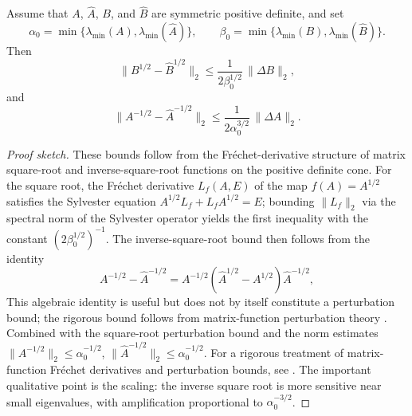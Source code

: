 \begin{proposition}
	Assume that \(A\), \(\widehat A\), \(B\), and \(\widehat B\) are symmetric positive
	definite, and set
	\[
		\alpha_0 = \min\{\lambda_{\min}(A), \lambda_{\min}(\widehat A)\},
		\qquad
		\beta_0 = \min\{\lambda_{\min}(B), \lambda_{\min}(\widehat B)\}.
	\]
	Then
	\[
		\|B^{1/2} - \widehat B^{1/2}\|_2
		\le
		\frac{1}{2\beta_0^{1/2}}\,\|\Delta B\|_2,
	\]
	and
	\[
		\|A^{-1/2} - \widehat A^{-1/2}\|_2
		\le
		\frac{1}{2\alpha_0^{3/2}}\,\|\Delta A\|_2.
	\]
\end{proposition}

\begin{proof}[Proof sketch]
	These bounds follow from the Fr\'echet-derivative structure of matrix
	square-root and inverse-square-root functions on the positive definite cone.
	For the square root, the Fr\'echet derivative \(L_f(A, E)\) of the map
	\(f(A) = A^{1/2}\) satisfies the Sylvester equation
	\(A^{1/2} L_f + L_f A^{1/2} = E\); bounding \(\|L_f\|_2\) via the
	spectral norm of the Sylvester operator yields the first inequality with the
	constant \((2\beta_0^{1/2})^{-1}\). The inverse-square-root bound then
	follows from the identity
	\[
		A^{-1/2} - \widehat A^{-1/2}
		=
		A^{-1/2}(\widehat A^{1/2} - A^{1/2})\widehat A^{-1/2},
	\]
	This algebraic identity is useful but does not by itself constitute a
	perturbation bound; the rigorous bound follows from matrix-function
	perturbation theory \cite[Chs.~3 and 6]{higham2008functions}.
	Combined with the square-root perturbation bound and the norm estimates
	\(\|A^{-1/2}\|_2 \le \alpha_0^{-1/2}\),
	\(\|\widehat A^{-1/2}\|_2 \le \alpha_0^{-1/2}\).
	For a rigorous treatment of matrix-function Fr\'echet derivatives and
	perturbation bounds, see \cite[Chs.~3 and 6]{higham2008functions}. The
	important qualitative point is the scaling: the inverse square root is more
	sensitive near small eigenvalues, with amplification proportional to
	\(\alpha_0^{-3/2}\).
\end{proof}

